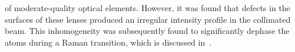of moderate-quality optical elements. However, it
was found that defects in the surfaces of these lenses produced an
irregular intensity profile in the collimated beam. This inhomogeneity
was subsequently found to significantly dephase the atoms during a
Raman transition, which is discussed
in~.
